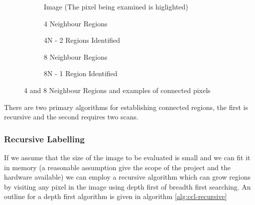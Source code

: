 \begin{figure}[h!]
    \centering
    \begin{subfigure}[b]{.6\linewidth}
        \centering
        
        \caption{Image (The pixel being examined is higlighted)}
    \end{subfigure}

    \vspace*{0.5in}

    \begin{subfigure}[b]{.4\linewidth}
        \centering
        
        \caption{4 Neighbour Regions}
        \label{fig:4-neighbour-regions}
    \end{subfigure}
    \begin{subfigure}[b]{.4\linewidth}
        \centering
        
        \caption{4N - 2 Regions Identified}
        \label{fig:4-neighbour-regions}
    \end{subfigure}

    \vspace*{0.5in}

    \begin{subfigure}[b]{.4\linewidth}
        \centering
        
        \label{fig:8-neighbour-regions}
        \caption{8 Neighbour Regions}
    \end{subfigure}
    \begin{subfigure}[b]{.4\linewidth}
        \centering
        
        \label{fig:8-neighbour-connected}
        \caption{8N - 1 Region Identified}
    \end{subfigure}

    \caption{4 and 8 Neighbour Regions and examples of connected pixels}
    \label{fig:pixel-neighbours}
\end{figure}

There are two primary algorithms for establishing connected regions, the first is recursive and the second requires two scans.

\subsubsection{Recursive Labelling}

If we assume that the size of the image to be evaluated is small and we can fit it in memory (a reasonable assumption give the scope of the project and the hardware available) we can employ a recursive algorithm which can grow regions by visiting any pixel in the image using depth first of breadth first searching. An outline for a depth first algorithm is given in algorithm \cref{alg:ccl-recursive}

